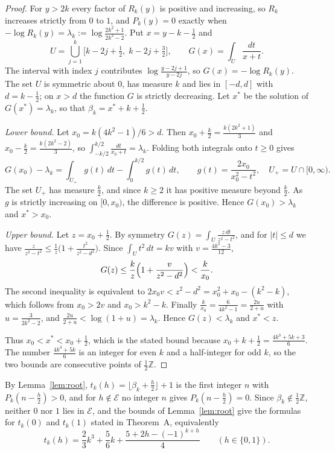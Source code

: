 \documentclass[11pt]{article}
\theoremstyle{definition}
\theoremstyle{remark}
\begin{document}
\begin{proof}
For $y>2k$ every factor of $R_k(y)$ is positive and increasing, so $R_k$
increases strictly from $0$ to $1$, and $P_k(y)=0$ exactly when
$-\log R_k(y)=\lambda_k:=\log\frac{2k^2+1}{2k^2-2}$. Put
$x=y-k-\frac12$ and
\[
U=\bigcup_{j=1}^{k}\bigl[k-2j+\tfrac12,\;k-2j+\tfrac32\bigr],\qquad
G(x)=\int_U\frac{dt}{x+t}.
\]
The interval with index $j$ contributes $\log\frac{y-2j+1}{y-2j}$, so
$G(x)=-\log R_k(y)$. The set $U$ is symmetric about $0$, has measure $k$
and lies in $[-d,d]$ with $d=k-\frac12$; on $x>d$ the function $G$ is
strictly decreasing. Let $x^*$ be the solution of $G(x^*)=\lambda_k$, so
that $\beta_k=x^*+k+\frac12$.

\emph{Lower bound.} Let $x_0=k(4k^2-1)/6>d$. Then
$x_0+\frac k2=\frac{k(2k^2+1)}3$ and $x_0-\frac k2=\frac{k(2k^2-2)}3$,
so $\int_{-k/2}^{k/2}\frac{dt}{x_0+t}=\lambda_k$. Folding both integrals
onto $t\ge0$ gives
\[
G(x_0)-\lambda_k=\int_{U_+}g(t)\,dt-\int_0^{k/2}g(t)\,dt,\qquad
g(t)=\frac{2x_0}{x_0^2-t^2},\quad U_+=U\cap[0,\infty).
\]
The set $U_+$ has measure $\frac k2$, and since $k\ge2$ it has positive
measure beyond $\frac k2$. As $g$ is strictly increasing on $[0,x_0)$,
the difference is positive. Hence $G(x_0)>\lambda_k$ and $x^*>x_0$.

\emph{Upper bound.} Let $z=x_0+\frac12$. By symmetry
$G(z)=\int_U\frac{z\,dt}{z^2-t^2}$, and for $|t|\le d$ we have
$\frac{z}{z^2-t^2}\le\frac1z\bigl(1+\frac{t^2}{z^2-d^2}\bigr)$. Since
$\int_Ut^2\,dt=kv$ with $v=\frac{4k^2-3}{12}$,
\[
G(z)\le\frac kz\Bigl(1+\frac{v}{z^2-d^2}\Bigr)<\frac k{x_0}.
\]
The second inequality is equivalent to $2x_0v<z^2-d^2=x_0^2+x_0-(k^2-k)$,
which follows from $x_0>2v$ and $x_0>k^2-k$. Finally
$\frac k{x_0}=\frac{6}{4k^2-1}=\frac{2u}{2+u}$ with $u=\frac3{2k^2-2}$,
and $\frac{2u}{2+u}<\log(1+u)=\lambda_k$. Hence $G(z)<\lambda_k$ and
$x^*<z$.

Thus $x_0<x^*<x_0+\frac12$, which is the stated bound because
$x_0+k+\frac12=\frac{4k^3+5k+3}6$. The number $\frac{4k^3+5k}6$ is an
integer for even $k$ and a half-integer for odd $k$, so the two bounds
are consecutive points of $\frac12\mathbb Z$.
\end{proof}

By Lemma~\ref{lem:root}, $t_k(h)=\lfloor\beta_k+\frac h2\rfloor+1$ is
the first integer $n$ with $P_k(n-\frac h2)>0$, and for $h\notin\mathcal
E$ no integer $n$ gives $P_k(n-\frac h2)=0$. Since
$\beta_k\notin\frac12\mathbb Z$, neither $0$ nor $1$ lies in $\mathcal
E$, and the bounds of Lemma~\ref{lem:root} give the formulas for
$t_k(0)$ and $t_k(1)$ stated in Theorem~A, equivalently
\begin{equation}\label{eq:tk-poly}
t_k(h)=\frac23k^3+\frac56k+\frac{5+2h-(-1)^{k+h}}4\qquad(h\in\{0,1\}).
\end{equation}
\end{document}
